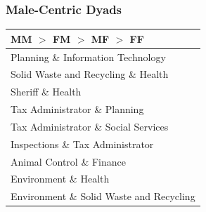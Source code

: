 \documentclass[xcolor={table}, fleqn]{beamer}
\newcommand{\male}[1]{\colorbox{male}{#1}}
\newcommand{\female}[1]{\colorbox{female}{#1}}
\begin{document}
\begin{frame}\frametitle{Male-Centric Dyads}
	\centering
	\Large
	\begin{tabular}{l}
	  \toprule
	  MM $>$ FM $>$ MF $>$ FF \\
	  \midrule
	  \male{Planning} \& \male{Information Technology} \\
	  \male{Solid Waste and Recycling} \& Health \\
	  \male{Sheriff} \& Health  \\
	  Tax Administrator \& \male{Planning}  \\
	  Tax Administrator \& Social Services  \\
	  \male{Inspections} \& Tax Administrator  \\
	  \male{Animal Control} \& \female{Finance}   \\
	  \male{Environment} \& Health  \\
	  \male{Environment} \& \male{Solid Waste and Recycling}  \\
	   \bottomrule
	\end{tabular}
\end{frame}
\end{document}

